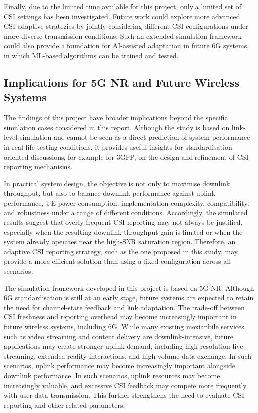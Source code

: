 \documentclass[a4paper,12pt,onecolumn]{article}
\begin{document}
		Finally, due to the limited time available for this project, only a limited set of CSI settings has been investigated. Future work could explore more advanced CSI-adaptive strategies by jointly considering different CSI configurations under more diverse transmission conditions. Such an extended simulation framework could also provide a foundation for AI-assisted adaptation in future 6G systems, in which ML-based algorithms can be trained and tested.

	
	\subsection{Implications for 5G NR and Future Wireless Systems}
	The findings of this project have broader implications beyond the specific simulation cases considered in this report. Although the study is based on link-level simulation and cannot be seen as a direct prediction of system performance in real-life testing conditions, it provides useful insights for standardisation-oriented discussions, for example for 3GPP, on the design and refinement of CSI reporting mechanisms. 
		
	In practical system design, the objective is not only to maximise downlink throughput, but also to balance downlink performance against uplink performance, UE power consumption, implementation complexity, compatibility, and robustness under a range of different conditions. Accordingly, the simulated results suggest that overly frequent CSI reporting may not always be justified, especially when the resulting downlink throughput gain is limited or when the system already operates near the high-SNR saturation region. Therefore, an adaptive CSI reporting strategy, such as the one proposed in this study, may provide a more efficient solution than using a fixed configuration across all scenarios.
		
	The simulation framework developed in this project is based on 5G NR. Although 6G standardisation is still at an early stage, future systems are expected to retain the need for channel-state feedback and link adaptation. The trade-off between CSI freshness and reporting overhead may become increasingly important in future wireless systems, including 6G. While many existing moxianbile services such as video streaming and content delivery are downlink-intensive, future applications may create stronger uplink demand, including high-resolution live streaming, extended-reality interactions, and high volume data exchange. In such scenarios, uplink performance may become increasingly important alongside downlink performance. In such scenarios, uplink resources may become increasingly valuable, and excessive CSI feedback may compete more frequently with user-data transmission. This further strengthens the need to evaluate CSI reporting and other related parameters.
		
\end{document}
